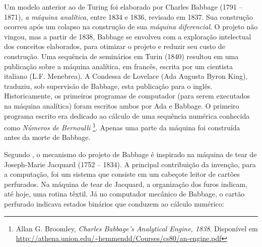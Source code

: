 Um modelo anterior ao de Turing foi elaborado por Charles Babbage (1791 -- 1871), \emph{a máquina analítica},  entre 1834 e 1836, revisado em 1837. Sua construção ocorreu após um colapso na construção de sua \emph{máquina diferencial}. O projeto não vingou, mas a partir de 1838, Babbage se envolveu com a exploração intelectual dos conceitos elaborados, para otimizar o projeto e reduzir seu custo de construção. Uma sequência de seminários em Turin (1840) resultou em uma publicação sobre a máquina analítica, em francês, escrita por um cientista italiano (L.F. Menebrea). A Condessa de Lovelace (Ada Augusta Byron King), traduziu, sob supervisão de Babbage, esta publicação para o inglês. Historicamente, os primeiros programas de computador (para serem executados na máquina analítica) foram escritos ambos por Ada e Babbage. O primeiro programa escrito era dedicado ao cálculo de uma sequência numérica conhecida como \emph{Números de Bernoulli} \footnote{Allan G. Broomley, \emph{Charles Babbage’s Analytical Engine, 1838}. Disponível em \url{http://athena.union.edu/~hemmendd/Courses/cs80/an-engine.pdf}}. Apenas uma parte da máquina foi construída antes da morte de Babbage.

Segundo , o mecanismo do projeto de Babbage é inspirado na máquina de tear de Joseph-Marie Jacquard (1752 -- 1834). A principal contribuição da invenção, para a computação, foi um sistema que consiste em um cabeçote leitor de cartões perfurados. Na máquina de tear de Jacquard, a organização dos furos indicam, até hoje, uma rotina têxtil. Já no computador mecânico de Babbage, o cartão perfurado indicava estados binários que conduzem ao cálculo numérico:

